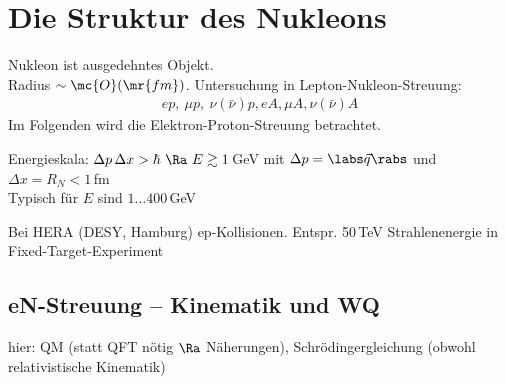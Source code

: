 \chapter{Die Struktur des Nukleons}
Nukleon ist ausgedehntes Objekt.\\
Radius $\sim \mc{O}(\mr{fm})$. Untersuchung in Lepton-Nukleon-Streuung:
\begin{align*}
ep, \ \mu p , \ \nu(\bar{\nu}) p, eA, \mu A, \nu(\bar{\nu}) A
\end{align*}
Im Folgenden wird die Elektron-Proton-Streuung betrachtet.

Energieskala: $\Delta p \, \Delta x > \hbar \ \Ra \ E \gtrsim 1$\,GeV mit $\Delta p = \labs \vec{q}\rabs$ und $\Delta x = R_N < 1$\,fm\\
Typisch für $E$ sind $1 \dots 400$\,GeV

Bei HERA (DESY, Hamburg) ep-Kollisionen. Entspr. 50\,TeV Strahlenenergie in Fixed-Target-Experiment

\section{eN-Streuung -- Kinematik und WQ}
hier: QM (statt QFT nötig $\Ra$ Näherungen), Schrödingergleichung (obwohl relativistische Kinematik)

